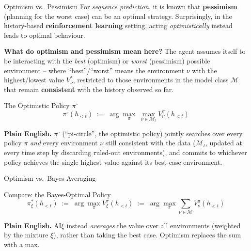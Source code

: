 \documentclass[aspectratio=169,10pt]{beamer}
\begin{document}
\begin{frame}{Optimism vs.\ Pessimism}
  For \emph{sequence prediction}, it is known that \textbf{pessimism}
  (planning for the worst case) can be an optimal strategy. Surprisingly, in
  the history-based \textbf{reinforcement learning} setting, acting
  \emph{optimistically} instead leads to optimal behaviour.

  \vspace{0.4em}
  \textbf{What do optimism and pessimism mean here?} The agent assumes
  itself to be interacting with the \emph{best} (optimism) or \emph{worst}
  (pessimism) possible environment -- where ``best''/``worst'' means the
  environment $\nu$ with the highest/lowest value $V^*_\nu$, restricted to
  those environments in the model class $\mathcal{M}$ that remain
  \textbf{consistent} with the history observed so far.

  \begin{block}{The Optimistic Policy $\pi^\circ$}
    \[
      \pi^\circ(h_{<t}) \;:=\; \arg\max_{\pi} \; \max_{\nu\in\mathcal{M}_t} V^\pi_\nu(h_{<t})
    \]
  \end{block}
  \textbf{Plain English.} $\pi^\circ$ (``pi-circle'', the optimistic policy)
  jointly searches over every policy $\pi$ \emph{and} every environment
  $\nu$ still consistent with the data ($\mathcal{M}_t$, updated at every
  time step by discarding ruled-out environments), and commits to whichever
  policy achieves the single highest value against its best-case
  environment.
\end{frame}

\begin{frame}{Optimism vs.\ Bayes-Averaging}
  \begin{block}{Compare: the Bayes-Optimal Policy}
    \[
      \pi^*_\xi(h_{<t}) \;:=\; \arg\max_{\pi} V^\pi_\xi(h_{<t}) \;:=\;
      \arg\max_{\pi} \sum_{\nu\in\mathcal{M}} V^\pi_\nu(h_{<t})
    \]
  \end{block}
  \textbf{Plain English.} AI$\xi$ instead \emph{averages} the value over all
  environments (weighted by the mixture $\xi$), rather than taking the best
  case. Optimism replaces the sum with a max.
\end{frame}
\end{document}
